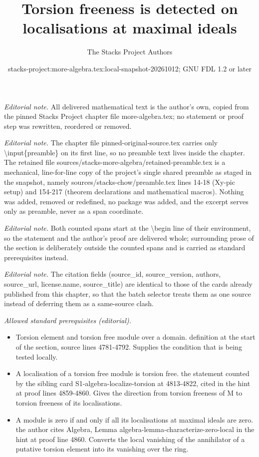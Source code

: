 \documentclass[10pt,a4paper]{amsart}
\title{Torsion freeness is detected on localisations at maximal ideals}
\author{The Stacks Project Authors}
\date{stacks-project:more-algebra.tex:local-snapshot-20261012; GNU FDL 1.2 or later}
\theoremstyle{plain}
\theoremstyle{definition}
\theoremstyle{remark}
\numberwithin{equation}{subsection}
\begin{document}
\maketitle
\setcounter{subsection}{1}
\noindent\textit{Editorial note.} All delivered mathematical text is the author's own, copied from the pinned Stacks Project chapter file more-algebra.tex; no statement or proof step was rewritten, reordered or removed.\par\medskip
\noindent\textit{Editorial note.} The chapter file pinned-original-source.tex carries only \textbackslash{}input\{preamble\} on its first line, so no preamble text lives inside the chapter. The retained file sources/stacks-more-algebra/retained-preamble.tex is a mechanical, line-for-line copy of the project's single shared preamble as staged in the snapshot, namely sources/stacks-chow/preamble.tex lines 14-18 (Xy-pic setup) and 154-217 (theorem declarations and mathematical macros). Nothing was added, removed or redefined, no package was added, and the excerpt serves only as preamble, never as a span coordinate.\par\medskip
\noindent\textit{Editorial note.} Both counted spans start at the \textbackslash{}begin line of their environment, so the statement and the author's proof are delivered whole; surrounding prose of the section is deliberately outside the counted spans and is carried as standard prerequisites instead.\par\medskip
\noindent\textit{Editorial note.} The citation fields (source\_id, source\_version, authors, source\_url, license.name, source\_title) are identical to those of the cards already published from this chapter, so that the batch selector treats them as one source instead of deferring them as a same-source clash.\par\medskip
\noindent\textit{Allowed standard prerequisites (editorial).}\begin{itemize}
\item Torsion element and torsion free module over a domain. definition at the start of the section, source lines 4781-4792. Supplies the condition that is being tested locally.
\item A localisation of a torsion free module is torsion free. the statement counted by the sibling card S1-algebra-localize-torsion at 4813-4822, cited in the hint at proof lines 4859-4860. Gives the direction from torsion freeness of M to torsion freeness of its localisations.
\item A module is zero if and only if all its localisations at maximal ideals are zero. the author cites Algebra, Lemma algebra-lemma-characterize-zero-local in the hint at proof line 4860. Converts the local vanishing of the annihilator of a putative torsion element into its vanishing over the ring.
\end{itemize}\medskip
\end{document}
